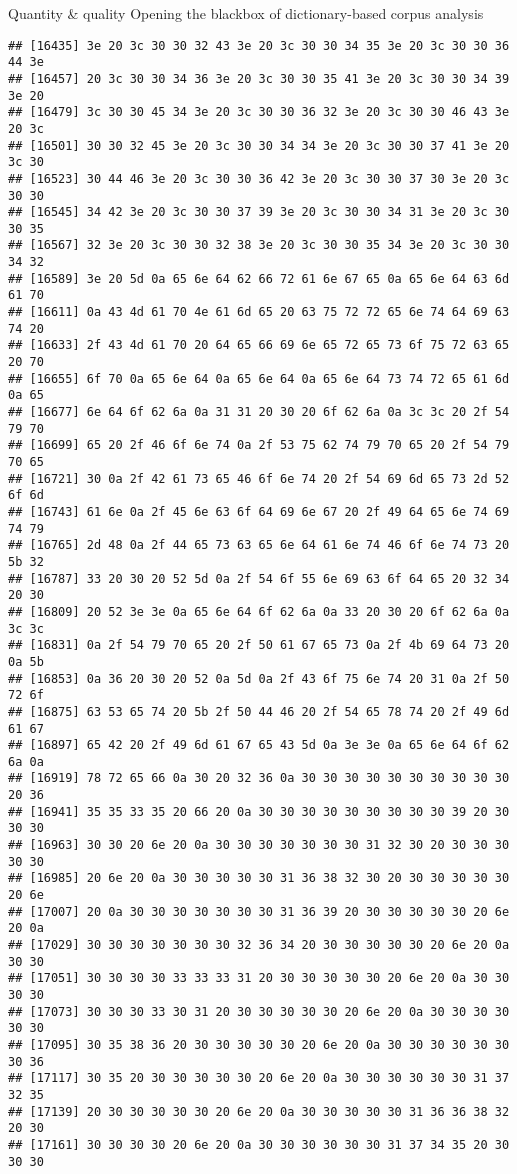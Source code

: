 \documentclass[
  ignorenonframetext,
]{beamer}
\begin{document}
\begin{frame}[fragile]{Quantity \& quality \textbar{} Opening the
blackbox of dictionary-based corpus analysis}
\begin{verbatim}
## [16435] 3e 20 3c 30 30 32 43 3e 20 3c 30 30 34 35 3e 20 3c 30 30 36 44 3e
## [16457] 20 3c 30 30 34 36 3e 20 3c 30 30 35 41 3e 20 3c 30 30 34 39 3e 20
## [16479] 3c 30 30 45 34 3e 20 3c 30 30 36 32 3e 20 3c 30 30 46 43 3e 20 3c
## [16501] 30 30 32 45 3e 20 3c 30 30 34 34 3e 20 3c 30 30 37 41 3e 20 3c 30
## [16523] 30 44 46 3e 20 3c 30 30 36 42 3e 20 3c 30 30 37 30 3e 20 3c 30 30
## [16545] 34 42 3e 20 3c 30 30 37 39 3e 20 3c 30 30 34 31 3e 20 3c 30 30 35
## [16567] 32 3e 20 3c 30 30 32 38 3e 20 3c 30 30 35 34 3e 20 3c 30 30 34 32
## [16589] 3e 20 5d 0a 65 6e 64 62 66 72 61 6e 67 65 0a 65 6e 64 63 6d 61 70
## [16611] 0a 43 4d 61 70 4e 61 6d 65 20 63 75 72 72 65 6e 74 64 69 63 74 20
## [16633] 2f 43 4d 61 70 20 64 65 66 69 6e 65 72 65 73 6f 75 72 63 65 20 70
## [16655] 6f 70 0a 65 6e 64 0a 65 6e 64 0a 65 6e 64 73 74 72 65 61 6d 0a 65
## [16677] 6e 64 6f 62 6a 0a 31 31 20 30 20 6f 62 6a 0a 3c 3c 20 2f 54 79 70
## [16699] 65 20 2f 46 6f 6e 74 0a 2f 53 75 62 74 79 70 65 20 2f 54 79 70 65
## [16721] 30 0a 2f 42 61 73 65 46 6f 6e 74 20 2f 54 69 6d 65 73 2d 52 6f 6d
## [16743] 61 6e 0a 2f 45 6e 63 6f 64 69 6e 67 20 2f 49 64 65 6e 74 69 74 79
## [16765] 2d 48 0a 2f 44 65 73 63 65 6e 64 61 6e 74 46 6f 6e 74 73 20 5b 32
## [16787] 33 20 30 20 52 5d 0a 2f 54 6f 55 6e 69 63 6f 64 65 20 32 34 20 30
## [16809] 20 52 3e 3e 0a 65 6e 64 6f 62 6a 0a 33 20 30 20 6f 62 6a 0a 3c 3c
## [16831] 0a 2f 54 79 70 65 20 2f 50 61 67 65 73 0a 2f 4b 69 64 73 20 0a 5b
## [16853] 0a 36 20 30 20 52 0a 5d 0a 2f 43 6f 75 6e 74 20 31 0a 2f 50 72 6f
## [16875] 63 53 65 74 20 5b 2f 50 44 46 20 2f 54 65 78 74 20 2f 49 6d 61 67
## [16897] 65 42 20 2f 49 6d 61 67 65 43 5d 0a 3e 3e 0a 65 6e 64 6f 62 6a 0a
## [16919] 78 72 65 66 0a 30 20 32 36 0a 30 30 30 30 30 30 30 30 30 30 20 36
## [16941] 35 35 33 35 20 66 20 0a 30 30 30 30 30 30 30 30 30 39 20 30 30 30
## [16963] 30 30 20 6e 20 0a 30 30 30 30 30 30 30 31 32 30 20 30 30 30 30 30
## [16985] 20 6e 20 0a 30 30 30 30 30 31 36 38 32 30 20 30 30 30 30 30 20 6e
## [17007] 20 0a 30 30 30 30 30 30 30 31 36 39 20 30 30 30 30 30 20 6e 20 0a
## [17029] 30 30 30 30 30 30 30 32 36 34 20 30 30 30 30 30 20 6e 20 0a 30 30
## [17051] 30 30 30 30 33 33 33 31 20 30 30 30 30 30 20 6e 20 0a 30 30 30 30
## [17073] 30 30 30 33 30 31 20 30 30 30 30 30 20 6e 20 0a 30 30 30 30 30 30
## [17095] 30 35 38 36 20 30 30 30 30 30 20 6e 20 0a 30 30 30 30 30 30 30 36
## [17117] 30 35 20 30 30 30 30 30 20 6e 20 0a 30 30 30 30 30 30 31 37 32 35
## [17139] 20 30 30 30 30 30 20 6e 20 0a 30 30 30 30 30 31 36 36 38 32 20 30
## [17161] 30 30 30 30 20 6e 20 0a 30 30 30 30 30 30 31 37 34 35 20 30 30 30

\end{verbatim}
\end{frame}
\end{document}
